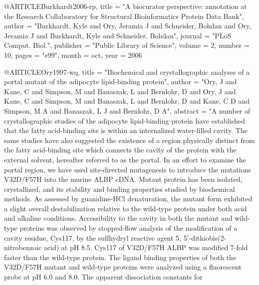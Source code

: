 @ARTICLE{Burkhardt2006-rp,
  title     = "A biocurator perspective: annotation at the Research
               Collaboratory for Structural Bioinformatics Protein Data Bank",
  author    = "Burkhardt, Kyle and Ory, Jeramia J and Schneider, Bohdan and
               Ory, Jeramia J and Burkhardt, Kyle and Schneider, Bohdan",
  journal   = "PLoS Comput. Biol.",
  publisher = "Public Library of Science",
  volume    =  2,
  number    =  10,
  pages     = "e99",
  month     =  oct,
  year      =  2006
}

@ARTICLE{Ory1997-wq,
  title    = "Biochemical and crystallographic analyses of a portal mutant of
              the adipocyte lipid-binding protein",
  author   = "Ory, J and Kane, C and Simpson, M and Banaszak, L and Bernlohr, D
              and Ory, J and Kane, C and Simpson, M and Banaszak, L and
              Bernlohr, D and Kane, C D and Simpson, M A and Banaszak, L J and
              Bernlohr, D A",
  abstract = "A number of crystallographic studies of the adipocyte
              lipid-binding protein have established that the fatty
              acid-binding site is within an internalized water-filled cavity.
              The same studies have also suggested the existence of a region
              physically distinct from the fatty acid-binding site which
              connects the cavity of the protein with the external solvent,
              hereafter referred to as the portal. In an effort to examine the
              portal region, we have used site-directed mutagenesis to
              introduce the mutations V32D/F57H into the murine ALBP cDNA.
              Mutant protein has been isolated, crystallized, and its stability
              and binding properties studied by biochemical methods. As
              assessed by guanidine-HCl denaturation, the mutant form exhibited
              a slight overall destabilization relative to the wild-type
              protein under both acid and alkaline conditions. Accessibility to
              the cavity in both the mutant and wild-type proteins was observed
              by stopped-flow analysis of the modification of a cavity residue,
              Cys117, by the sulfhydryl reactive agent 5,
              5'-dithiobis(2-nitrobenzoic acid) at pH 8.5. Cys117 of V32D/F57H
              ALBP was modified 7-fold faster than the wild-type protein. The
              ligand binding properties of both the V32D/F57H mutant and
              wild-type proteins were analyzed using a fluorescent probe at pH
              6.0 and 8.0. The apparent dissociation constants for
}

